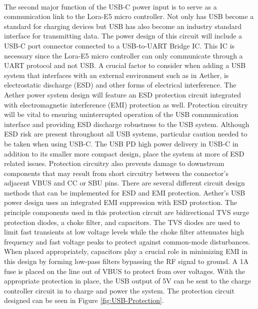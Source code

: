 \paragraph{}
The second major function of the USB-C power input is to serve as a communication link to the Lora-E5 micro controller. Not only has USB become a standard for charging devices but USB has also become an industry standard interface for transmitting data. The power design of this circuit will include a USB-C port connector connected to a USB-to-UART Bridge IC.  This IC is necessary since the Lora-E5 micro controller can only communicate through a UART protocol and not USB. A crucial factor to consider when adding a USB system that interfaces with an external environment such as in Aether, is electrostatic discharge (ESD) and other forms of electrical interference. The Aether power system design will feature an ESD protection circuit integrated with electromagnetic interference (EMI) protection as well. Protection circuitry will be vital to ensuring uninterrupted operation of the USB communication interface and providing ESD discharge robustness to the USB system. Although ESD risk are present throughout all USB systems, particular caution needed to be taken when using USB-C. The USB PD high power delivery in USB-C in addition to its smaller more compact design, place the system at more of ESD related issues. Protection circuitry also prevents damage to downstream components that may result from short circuitry between the connector’s adjacent VBUS and CC or SBU pins. There are several different circuit design methods that can be implemented for ESD and EMI protection. Aether's USB power design uses an integrated EMI suppression with ESD protection. The principle components used in this protection circuit are bidirectional TVS surge protection diodes, a choke filter, and capacitors. The TVS diodes are used to limit fast transients at low voltage levels while the choke filter attenuates high frequency and fast voltage peaks to protect against common-mode disturbances. When placed appropriately, capacitors play a crucial role in minimizing EMI in this design by forming low-pass filters bypassing the RF signal to ground. A 1A fuse is placed on the line out of VBUS to protect from over voltages. With the appropriate protection in place, the USB output of 5V can be sent to the charge controller circuit in to charge and power the system. The protection circuit designed can be seen in Figure \ref{fig:USB-Protection}. 

